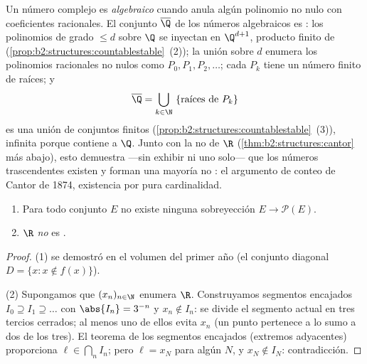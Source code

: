 \begin{example}\label{ex:b2:structures:algebraic}
Un número complejo es \emph{algebraico} cuando anula algún
polinomio no nulo con coeficientes racionales. El conjunto
$\overline\Q$ de los números algebraicos es : los polinomios
de grado $\leq d$ sobre $\Q$ se inyectan en $\Q^{d+1}$, producto
finito de 
(\cref{prop:b2:structures:countablestable}~(2)); la unión sobre
$d$ enumera los polinomios racionales no nulos como $P_0, P_1,
P_2, \dots$; cada $P_k$ tiene un número finito de raíces; y
\[
\overline\Q = \bigcup_{k \in \N}\ \{\text{raíces de } P_k\}
\]
es una unión  de conjuntos finitos
(\cref{prop:b2:structures:countablestable}~(3)), infinita porque
contiene a $\Q$. Junto con la no  de $\R$
(\cref{thm:b2:structures:cantor} más abajo), esto demuestra ---sin
exhibir ni uno solo--- que los números trascendentes existen y
forman una mayoría no : el argumento de conteo de Cantor
de 1874, existencia por pura cardinalidad.
\end{example}

\begin{theorem}\label{thm:b2:structures:cantor}
\begin{enumerate}
  \item Para todo conjunto $E$ no existe ninguna sobreyección $E \to
        \mathcal{P}(E)$.
  \item $\R$ \emph{no} es .
\end{enumerate}
\end{theorem}

\begin{proof}
(1) se demostró en el volumen del primer año (el conjunto diagonal
$D = \{x : x \notin f(x)\}$).

(2) Supongamos que $(x_n)_{n \in \N}$ enumera $\R$. Construyamos
segmentos encajados $I_0 \supseteq I_1 \supseteq \dots$ con
$\abs{I_n} = 3^{-n}$ y $x_n \notin I_n$: se divide el segmento actual
en tres tercios cerrados; al menos uno de ellos evita $x_n$ (un punto
pertenece a lo sumo a dos de los tres). El teorema de los segmentos
encajados (extremos adyacentes) proporciona $\ell \in \bigcap_n I_n$;
pero $\ell = x_N$ para algún $N$, y $x_N \notin I_N$: contradicción.
\end{proof}

